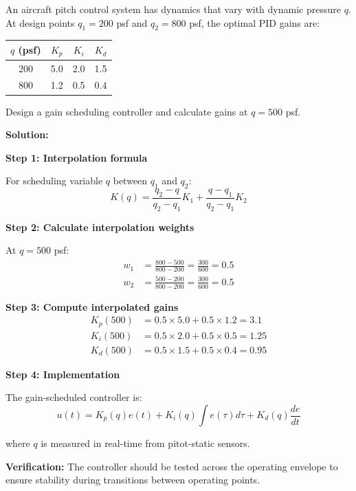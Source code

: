 \begin{example}
\label{ex:gain_scheduling}
An aircraft pitch control system has dynamics that vary with dynamic pressure $q$. At design points $q_1 = 200$ psf and $q_2 = 800$ psf, the optimal PID gains are:

\begin{center}
\begin{tabular}{cccc}
\toprule
$q$ (psf) & $K_p$ & $K_i$ & $K_d$ \\
\midrule
200 & 5.0 & 2.0 & 1.5 \\
800 & 1.2 & 0.5 & 0.4 \\
\bottomrule
\end{tabular}
\end{center}

Design a gain scheduling controller and calculate gains at $q = 500$ psf.

\textbf{Solution:}

\textbf{Step 1: Interpolation formula}

For scheduling variable $q$ between $q_1$ and $q_2$:
\begin{equation}
K(q) = \frac{q_2 - q}{q_2 - q_1}K_1 + \frac{q - q_1}{q_2 - q_1}K_2
\end{equation}

\textbf{Step 2: Calculate interpolation weights}

At $q = 500$ psf:
\begin{align}
w_1 &= \frac{800 - 500}{800 - 200} = \frac{300}{600} = 0.5 \\
w_2 &= \frac{500 - 200}{800 - 200} = \frac{300}{600} = 0.5
\end{align}

\textbf{Step 3: Compute interpolated gains}
\begin{align}
K_p(500) &= 0.5 \times 5.0 + 0.5 \times 1.2 = 3.1 \\
K_i(500) &= 0.5 \times 2.0 + 0.5 \times 0.5 = 1.25 \\
K_d(500) &= 0.5 \times 1.5 + 0.5 \times 0.4 = 0.95
\end{align}

\textbf{Step 4: Implementation}

The gain-scheduled controller is:
\begin{equation}
u(t) = K_p(q) e(t) + K_i(q) \int e(\tau) d\tau + K_d(q) \frac{de}{dt}
\end{equation}

where $q$ is measured in real-time from pitot-static sensors.

\textbf{Verification:} The controller should be tested across the operating envelope to ensure stability during transitions between operating points.
\end{example}

